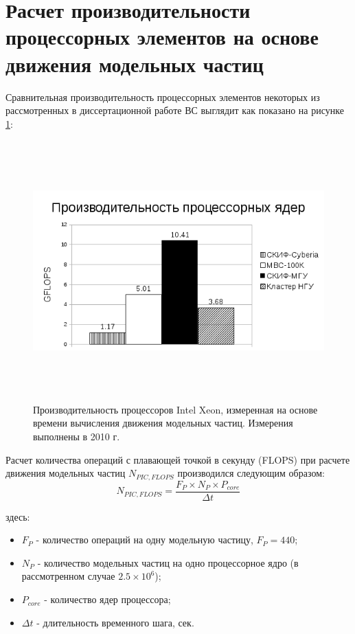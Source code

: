 \section{Расчет производительности процессорных элементов на основе движения модельных частиц}
\label{calc_PE}
 Сравнительная производительность процессорных элементов некоторых из рассмотренных в диссертационной работе ВС выглядит как показано на рисунке  \ref{procs_flops_pic}:

\begin{figure}[htb]
	\begin{center}
		\includegraphics[height=10cm,keepaspectratio]{images/processor_FLOPS_PIC.png}
	\end{center}
	\caption{Производительность процессоров Intel Xeon, измеренная на основе времени вычисления движения модельных частиц. Измерения выполнены в 2010 г.}
	\label{procs_flops_pic}
\end{figure} 

Расчет количества операций с плавающей точкой в секунду (FLOPS) при расчете движения модельных частиц $N_{PIC,FLOPS}$ производился следующим образом:
\begin{equation}
N_{PIC,FLOPS} = \frac{F_P\times N_P \times P_{core}}{\Delta t}
\label{PIC_FLOPS}
\end{equation}

здесь:
\begin{itemize}
	\item $F_P$ - количество операций на одну модельную частицу, $F_P = 440$;
	\item $N_P$ - количество модельных частиц на одно процессорное ядро (в рассмотренном случае $2.5\times 10^6$);  
	\item $P_{core}$ - количество ядер процессора;
	\item $\Delta t$  - длительность временного шага, сек.
\end{itemize}	

